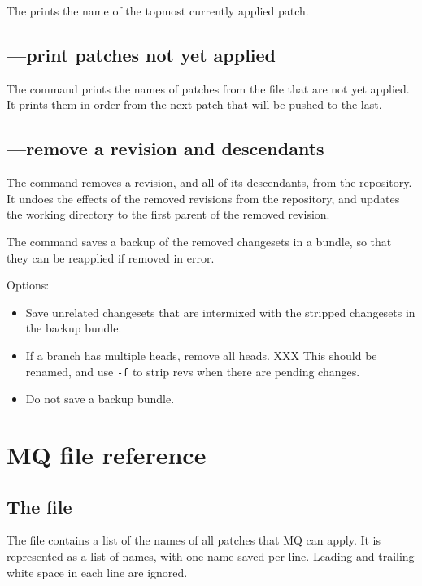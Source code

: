 The  prints the name of the topmost currently applied
patch.

\subsection{---print patches not yet applied}

The  command prints the names of patches from the
 file that are not yet applied.  It prints them in
order from the next patch that will be pushed to the last.

\subsection{---remove a revision and descendants}

The  command removes a revision, and all of its
descendants, from the repository.  It undoes the effects of the
removed revisions from the repository, and updates the working
directory to the first parent of the removed revision.

The  command saves a backup of the removed changesets in
a bundle, so that they can be reapplied if removed in error.

Options:
\begin{itemize}
\item[\hgopt{strip}{-b}] Save unrelated changesets that are intermixed
  with the stripped changesets in the backup bundle.
\item[\hgopt{strip}{-f}] If a branch has multiple heads, remove all
  heads. XXX This should be renamed, and use \texttt{-f} to strip revs
  when there are pending changes.
\item[\hgopt{strip}{-n}] Do not save a backup bundle.
\end{itemize}

\section{MQ file reference}

\subsection{The  file}

The  file contains a list of the names of all
patches that MQ can apply.  It is represented as a list of names, with
one name saved per line.  Leading and trailing white space in each
line are ignored.

